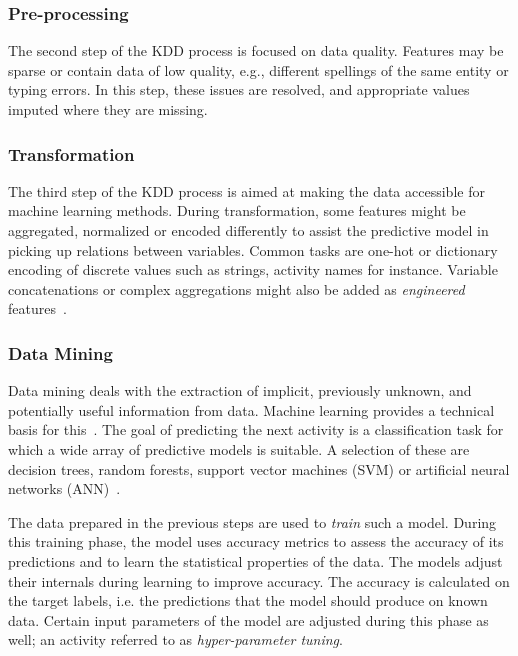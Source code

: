 \subsubsection*{Pre-processing}
The second step of the KDD process is focused on data quality. Features may be sparse or contain data of low quality, e.g., different spellings of the same entity or typing errors. In this step, these issues are resolved, and appropriate values imputed where they are missing.

\subsubsection*{Transformation}\label{sec:predictive-model-development:transformation}
The third step of the KDD process is aimed at making the data accessible for machine learning methods. During transformation, some features might be aggregated, normalized or encoded differently to assist the predictive model in picking up relations between variables. Common tasks are one-hot or dictionary encoding of discrete values such as strings, activity names for instance. Variable concatenations or complex aggregations might also be added as \textit{engineered} features~\cite{kuhn2013applied}.

\subsubsection*{Data Mining}
Data mining deals with the extraction of implicit, previously unknown, and potentially useful information from data. Machine learning provides a technical basis for this~\cite{Aalst2016}. The goal of predicting the next activity is a classification task for which a wide array of predictive models is suitable. A selection of these are decision trees, random forests, support vector machines (SVM) or artificial neural networks (ANN)~\cite{kuhn2013applied}.

The data prepared in the previous steps are used to \textit{train} such a model. During this training phase, the model uses accuracy metrics to assess the accuracy of its predictions and to learn the statistical properties of the data. The models adjust their internals during learning to improve accuracy. The accuracy is calculated on the target labels, i.e. the predictions that the model should produce on known data.
Certain input parameters of the model are adjusted during this phase as well; an activity referred to as \textit{hyper-parameter tuning}.

